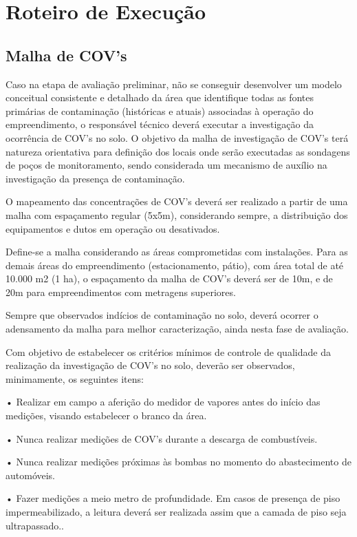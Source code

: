 \section{Roteiro de Execução}

\subsection{Malha de COV’s}

Caso na etapa de avaliação preliminar, não se conseguir 
desenvolver um modelo conceitual consistente e detalhado da 
área que identifique todas as fontes primárias de 
contaminação (históricas e atuais) associadas à operação do 
empreendimento, o responsável técnico deverá executar a 
investigação da ocorrência de COV’s no solo. O objetivo da 
malha de investigação de COV’s terá natureza orientativa 
para definição dos locais onde serão executadas as 
sondagens de poços de monitoramento, sendo considerada um 
mecanismo de auxílio na investigação da presença de 
contaminação.

O mapeamento das concentrações de COV’s deverá ser 
realizado a partir de uma malha com espaçamento regular 
(5x5m), considerando sempre, a distribuição dos 
equipamentos e dutos em operação ou desativados.

Define-se a malha considerando as áreas comprometidas com 
instalações. Para as demais áreas do empreendimento 
(estacionamento, pátio), com área total de até 10.000 m2 (1 
ha), o espaçamento da malha de COV’s deverá ser de 10m, e 
de 20m para empreendimentos com metragens superiores.

Sempre que observados indícios de contaminação no solo, 
deverá ocorrer o adensamento da malha para melhor 
caracterização, ainda nesta fase de avaliação.

Com objetivo de estabelecer os critérios mínimos de 
controle de qualidade da realização da investigação de 
COV’s no solo, deverão ser observados, minimamente, os 
seguintes itens:

• Realizar em campo a aferição do medidor de vapores antes 
do início das medições, visando estabelecer o branco da 
área.

• Nunca realizar medições de COV’s durante a descarga de 
combustíveis.

• Nunca realizar medições próximas às bombas no momento do 
abastecimento de automóveis.

• Fazer medições a meio metro de profundidade. Em casos de 
presença de piso impermeabilizado, a leitura deverá ser 
realizada assim que a camada de piso seja ultrapassado..


